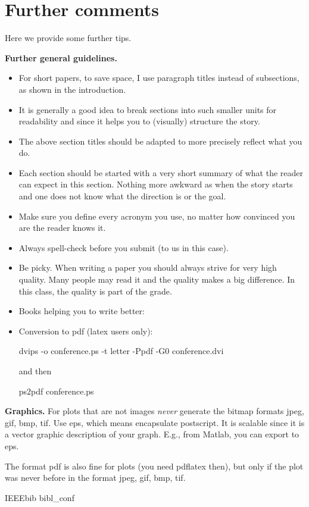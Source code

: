 \documentclass[letterpaper]{article}
\newcommand{\mypar}[1]{{\bf #1.}} %
\begin{document}
	
	
	\section{Further comments}
	
	Here we provide some further tips.
	
	\mypar{Further general guidelines}
	
	\begin{itemize}
	\item For short papers, to save space, I use paragraph titles instead of
	subsections, as shown in the introduction.
	
	\item It is generally a good idea to break sections into such smaller
	units for readability and since it helps you to (visually) structure the story.
	
	\item The above section titles should be adapted to more precisely
	reflect what you do.
	
	\item Each section should be started with a very
	short summary of what the reader can expect in this section. Nothing
	more awkward as when the story starts and one does not know what the
	direction is or the goal.
	
	\item Make sure you define every acronym you use, no matter how
	convinced you are the reader knows it.
	
	\item Always spell-check before you submit (to us in this case).
	
	\item Be picky. When writing a paper you should always strive for very
	high quality. Many people may read it and the quality makes a big difference.
	In this class, the quality is part of the grade.
	
	\item Books helping you to write better:
	
	\item Conversion to pdf (latex users only): 
	
	dvips -o conference.ps -t letter -Ppdf -G0 conference.dvi
	
	and then
	
	ps2pdf conference.ps
	\end{itemize}
	
	\mypar{Graphics} For plots that are not images {\em never} generate the bitmap formats
	jpeg, gif, bmp, tif. Use eps, which means encapsulate postscript. It is
	scalable since it is a vector graphic description of your graph. E.g.,
	from Matlab, you can export to eps.
	
	The format pdf is also fine for plots (you need pdflatex then), but only if the plot was never before in the format 
	jpeg, gif, bmp, tif.

	 	{IEEEbib	} %
	 		{bibl_conf	}
\end{document}
